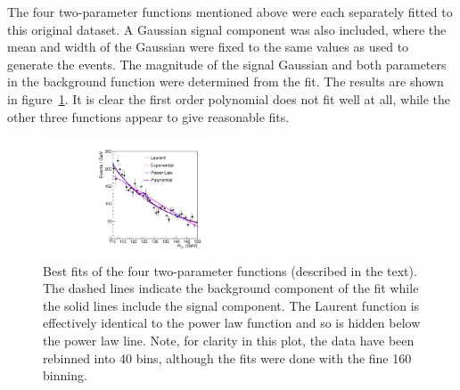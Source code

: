 The four two-parameter functions mentioned above were each 
separately fitted to this
original dataset. A Gaussian signal component was also included, where the
mean and width of the Gaussian were fixed to the same values as used to
generate the events.
The magnitude of the signal Gaussian and both parameters in the
background function were determined from the fit.
The results are shown in figure~\ref{fig:functions:bestfits}.
It is clear the first order polynomial does not fit well at all, while the 
other three functions appear to give reasonable fits.
%
\begin{figure}[tbp]
\centering
\includegraphics[width=0.45\textwidth]{functions/BestFits.pdf}
\caption{Best fits of the four two-parameter functions (described in the
text). The dashed lines indicate the background component of the fit while the solid lines include  
the signal component. The Laurent function is effectively identical to the power law function
and so is hidden below the power law line. Note, for clarity in this plot, the
data have been rebinned into 40 bins, although the fits were done with the
fine 160 binning.}
\label{fig:functions:bestfits}
\end{figure}


